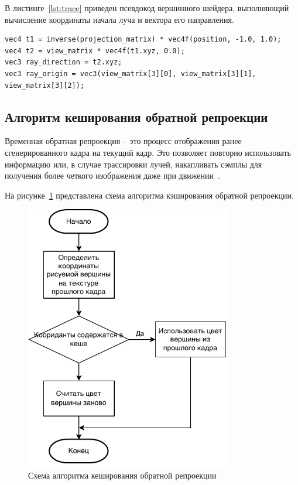 В листинге~\ref{lst:trace} приведен псевдокод вершинного шейдера, выполняющий вычисление
координаты начала луча и вектора его направления.

\begin{lstlisting}[caption={Вычисление координаты начала луча и вектора его направления},label={lst:trace},frame=single]
vec4 t1 = inverse(projection_matrix) * vec4f(position, -1.0, 1.0);
vec4 t2 = view_matrix * vec4f(t1.xyz, 0.0);
vec3 ray_direction = t2.xyz;
vec3 ray_origin = vec3(view_matrix[3][0], view_matrix[3][1], view_matrix[3][2]);
\end{lstlisting}

\subsection{Алгоритм кеширования обратной репроекции}

Временная обратная репроекция -- это процесс отображения ранее сгенерированного кадра на 
текущий кадр. Это позволяет повторно использовать информацию или, в случае трассировки 
лучей, накапливать сэмплы для получения более четкого изображения даже при 
движении~\cite{ARTSwRPC}.

На рисунке~\ref{img:rrc} представлена схема алгоритма кэширования обратной
репроекции.

\begin{figure}[H]
	\centering
	\includegraphics[width=90mm]{inc/pdf/rrc}
	\caption{Схема алгоритма кеширования обратной репроекции}
	\label{img:rrc}
\end{figure}

